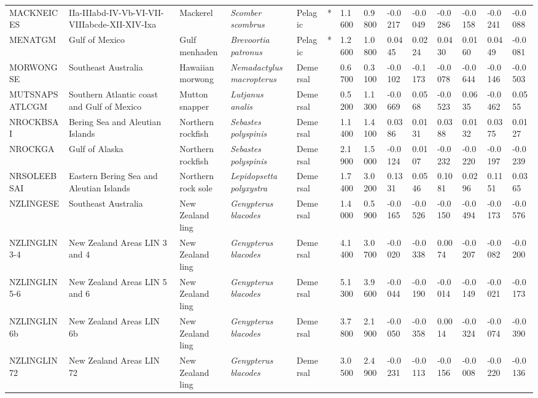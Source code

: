 \begin{longtable}{p{2.8cm}p{2cm}p{1.7cm}p{1.7cm}p{1cm}p{0.3cm}p{1cm}p{1cm}p{1cm}p{1cm}p{1cm}p{1cm}p{1cm}p{1cm}}
  MACKNEICES & IIa-IIIabd-IV-Vb-VI-VII-VIIIabcde-XII-XIV-Ixa & Mackerel & \textit{Scomber scombrus} & Pelagic & * & 1.1600 & 0.9800 & -0.0217 & -0.0049 & -0.0286 & -0.0158 & -0.0241 & -0.0088 \\ 
  MENATGM & Gulf of Mexico & Gulf menhaden & \textit{Brevoortia patronus} & Pelagic & * & 1.2600 & 1.0800 & 0.0445 & 0.0224 & 0.0430 & 0.0160 & 0.0449 & -0.0081 \\ 
  MORWONGSE & Southeast Australia & Hawaiian morwong & \textit{Nemadactylus macropterus} & Demersal &   & 0.6700 & 0.3100 & -0.0102 & -0.1173 & -0.0078 & -0.0644 & -0.0146 & -0.0503 \\ 
  MUTSNAPSATLCGM & Southern Atlantic coast and Gulf of Mexico & Mutton snapper & \textit{Lutjanus analis} & Demersal &   & 0.5200 & 1.1300 & -0.0669 & 0.0568 & -0.0523 & 0.0635 & -0.0462 & 0.0555 \\ 
  NROCKBSAI & Bering Sea and Aleutian Islands & Northern rockfish & \textit{Sebastes polyspinis} & Demersal &   & 1.1400 & 1.4100 & 0.0386 & 0.0131 & 0.0388 & 0.0132 & 0.0375 & 0.0127 \\ 
  NROCKGA & Gulf of Alaska & Northern rockfish & \textit{Sebastes polyspinis} & Demersal &   & 2.1900 & 1.5000 & -0.0124 & 0.0107 & -0.0232 & -0.0220 & -0.0197 & -0.0239 \\ 
  NRSOLEEBSAI & Eastern Bering Sea and Aleutian Islands & Northern rock sole & \textit{Lepidopsetta polyxystra} & Demersal &   & 1.7400 & 3.0200 & 0.1331 & 0.0546 & 0.1081 & 0.0296 & 0.1151 & 0.0365 \\ 
  NZLINGESE & Southeast Australia & New Zealand ling & \textit{Genypterus blacodes} & Demersal &   & 1.4000 & 0.5900 & -0.0165 & -0.0526 & -0.0150 & -0.0494 & -0.0173 & -0.0576 \\ 
  NZLINGLIN3-4 & New Zealand Areas LIN 3 and 4 & New Zealand ling & \textit{Genypterus blacodes} & Demersal &   & 4.1400 & 3.0700 & -0.0020 & -0.0338 & 0.0074 & -0.0207 & -0.0082 & -0.0200 \\ 
  NZLINGLIN5-6 & New Zealand Areas LIN 5 and 6 & New Zealand ling & \textit{Genypterus blacodes} & Demersal &   & 5.1300 & 3.9600 & -0.0044 & -0.0190 & -0.0014 & -0.0149 & -0.0021 & -0.0173 \\ 
  NZLINGLIN6b & New Zealand Areas LIN 6b & New Zealand ling & \textit{Genypterus blacodes} & Demersal &   & 3.7800 & 2.1900 & -0.0050 & -0.0358 & 0.0014 & -0.0324 & -0.0074 & -0.0390 \\ 
  NZLINGLIN72 & New Zealand Areas LIN 72 & New Zealand ling & \textit{Genypterus blacodes} & Demersal &   & 3.0500 & 2.4900 & -0.0231 & -0.0113 & -0.0156 & -0.0008 & -0.0220 & -0.0136 \\ 

\end{longtable}

